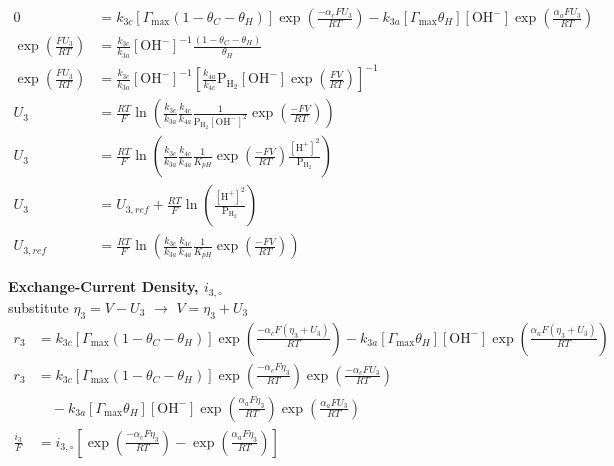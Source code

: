 \documentclass[12pt]{article}
\begin{document}
  \begin{equation*}
  \begin{split}
    0 &= k_{3c} \left[\Gamma_{\max} (1 - \theta_C - \theta_H) \right] \exp{ \left( \frac{-\alpha_c F U_3}{RT} \right)}
    - k_{3a} \left[ \Gamma_{\max} \theta_H \right] \left[\text{OH}^- \right]
    \exp{\left( \frac{\alpha_a F U_3}{RT} \right)}
    \\
    \exp{ \left( \frac{FU_3}{RT} \right)} &=
    \frac{k_{3c}}{k_{3a}} \left[\text{OH}^- \right]^{-1} \frac{(1 - \theta_C - \theta_H)}{\theta_H}
    \\
    \exp{ \left( \frac{FU_3}{RT} \right)} &=
    \frac{k_{3c}}{k_{3a}} \left[\text{OH}^- \right]^{-1} \left[ \frac{k_{4a}}{k_{4c}} \text{P}_{\text{H}_2} \left[\text{OH}^- \right]
    \exp{\left( \frac{ F V}{RT} \right)} \right]^{-1}
    \\
    U_3 &= \frac{RT}{F} \ln{\left( \frac{k_{3c}}{k_{3a}} \frac{k_{4c}}{k_{4a}} \frac{1}{\text{P}_{\text{H}_2} \left[\text{OH}^- \right]^{2}}
    \exp{\left( \frac{- F V}{RT} \right)} \right)}
    \\
    U_3 &= \frac{RT}{F} \ln{\left( \frac{k_{3c}}{k_{3a}} \frac{k_{4c}}{k_{4a}}\frac{1}{K_{pH}} \exp{\left( \frac{- F V}{RT} \right)}
    \frac{\left[\text{H}^+ \right]^{2}}{\text{P}_{\text{H}_2} } \right)}
    \\
    U_3 &= U_{3,ref} + \frac{RT}{F} \ln{\left(
    \frac{\left[\text{H}^+ \right]^{2}}{\text{P}_{\text{H}_2} } \right)}
    \\
    U_{3,ref} &= \frac{RT}{F} \ln{\left( \frac{k_{3c}}{k_{3a}} \frac{k_{4c}}{k_{4a}}\frac{1}{K_{pH}} \exp{\left( \frac{- F V}{RT} \right)} \right)}
  \end{split}
  \end{equation*}

  \clearpage
  \textbf{Exchange-Current Density, $i_{3,\circ}$} \\
  substitute $ \eta_3 = V - U_3$ $\rightarrow$ $ V = \eta_3 + U_3$
  \begin{equation*}
  \begin{split}
    r_3 &= k_{3c} \left[\Gamma_{\max} (1 - \theta_C - \theta_H) \right] \exp{ \left( \frac{-\alpha_c F (\eta_3 + U_3)}{RT} \right)}
    - k_{3a} \left[ \Gamma_{\max} \theta_H \right] \left[\text{OH}^- \right]
    \exp{\left( \frac{\alpha_a F (\eta_3 + U_3)}{RT} \right)}
    \\
    r_3 &= k_{3c} \left[\Gamma_{\max} (1 - \theta_C - \theta_H) \right] \exp{ \left( \frac{-\alpha_c F \eta_3}{RT} \right)} \exp{ \left( \frac{-\alpha_c F U_3}{RT} \right)} \\
    & \quad - k_{3a} \left[ \Gamma_{\max} \theta_H \right] \left[\text{OH}^- \right]
    \exp{\left( \frac{\alpha_a F \eta_3}{RT} \right)} \exp{\left( \frac{\alpha_a F U_3}{RT} \right)}
    \\
    \frac{i_3}{F} &= i_{3, \circ} \left[ \exp{\left( \frac{-\alpha_c F \eta_3}{RT} \right)} -\exp{\left( \frac{\alpha_a F \eta_3}{RT} \right)}  \right]
  \end{split}
  \end{equation*}
\end{document}

